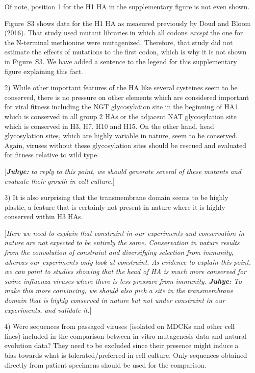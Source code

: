 \documentclass[11pt, oneside]{article}   	%
\newcommand{\comment}[1]{{\color{red}[\textsl{#1}]}}
\newcommand{\response}[1]{{\color{black}#1}}
\begin{document}
Of note, position 1 for the H1 HA in the supplementary figure is not even shown. 

\response{Figure~S3 shows data for the H1 HA as measured previously by Doud and Bloom (2016). 
That study used mutant libraries in which all codons \emph{except} the one for the N-terminal methionine were mutagenized.
Therefore, that study did not estimate the effects of mutations to the first codon, which is why it is not shown in Figure~S3.
We have added a sentence to the legend for this supplementary figure explaining this fact.
}

2) While other important features of the HA like several cysteines seem to be conserved, there is no pressure on other elements which are considered important for viral fitness including the NGT glycosylation site in the beginning of HA1 which is conserved in all group 2 HAs or the adjacent NAT glycosylation site which is conserved in H3, H7, H10 and H15. On the other hand, head glycosylation sites, which are highly variable in nature, seem to be conserved. Again, viruses without these glycosylation sites should be rescued and evaluated for fitness relative to wild type. 

\comment{{\bf Juhye:} to reply to this point, we should generate several of these mutants and evaluate their growth in cell culture.}

3) It is also surprising that the transmembrane domain seems to be highly plastic, a feature that is certainly not present in nature where it is highly conserved within H3 HAs. 

\comment{Here we need to explain that constraint in our experiments and conservation in nature are not expected to be entirely the same.
Conservation in nature results from the convolution of constraint and diversifying selection from immunity, whereas our experiments only look at constraint.
As evidence to explain this point, we can point to studies showing that the head of HA is much more conserved for swine influenza viruses where there is less pressure from immunity.
{\bf Juhye:} To make this more convincing, we should also pick a site in the transmembrane domain that is highly conserved in nature but not under constraint in our experiments, and validate it.}

4) Were sequences from passaged viruses (isolated on MDCKs and other cell lines) included in the comparison between in vitro mutagenesis data and natural evolution data? They need to be excluded since their presence might induce a bias towards what is tolerated/preferred in cell culture. Only sequences obtained directly from patient specimens should be used for the comparison. 
\end{document}
